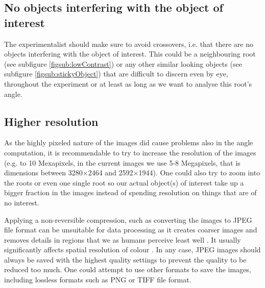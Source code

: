 \subsection{No objects interfering with the object of interest}

The experimentalist should make sure to avoid crossovers, i.e. that there are no objects interfering with the object of interest. This could be a neighbouring root (see subfigure \ref{figsub:lowContrast}) or any other similar looking objects (see subfigure \ref{figsub:stickyObject}) that are difficult to discern even by eye, throughout the experiment or at least as long as we want to analyse this root's angle. 





\subsection{Higher resolution}

As the highly pixeled nature of the images did cause problems also in the angle computation, it is recommendable to try to increase the resolution of the images (e.g. to 10 Mexapixels, in the current images we use 5-8 Megapixels, that is dimensions between 3280\(\times\)2464 and 2592\(\times\)1944). One could also try to zoom into the roots or even one single root so our actual object(s) of interest take up a bigger fraction in the images instead of spending resolution on things that are of no interest. 

Applying a non-reversible compression, such as converting the images to JPEG file format can be unsuitable for data processing \cite{french2009high} as it creates coarser images and removes details in regions that we as humans perceive least well \cite{french2009high}. It usually significantly affects spatial resolution of colour \cite{french2009high}. In any case, JPEG images should always be saved with the highest quality settings to prevent the quality to be reduced too much. 
%
One could attempt to use other formats to save the images, including lossless formats such as PNG or TIFF file format.

